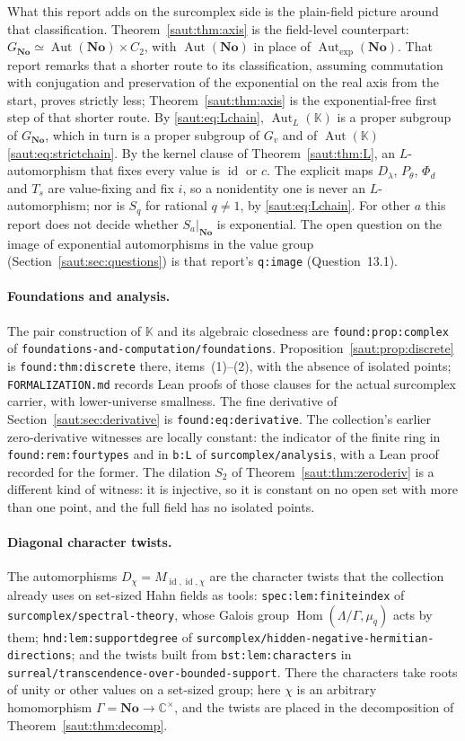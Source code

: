 \documentclass[11pt]{article}
\theoremstyle{definition}
\theoremstyle{remark}
\newcommand{\No}{\mathbf{No}}
\newcommand{\C}{\mathbb C}
\newcommand{\K}{\mathbb K}
\newcommand{\id}{\operatorname{id}}
\newcommand{\Aut}{\operatorname{Aut}}
\newcommand{\Hom}{\operatorname{Hom}}
\newcommand{\Gexp}{\operatorname{Aut}_{\exp}(\No)}
\newcommand{\AutL}{\operatorname{Aut}_{L}}
\newcommand{\repo}[1]{\nolinkurl{#1}}%
\newcommand{\lbl}[1]{\nolinkurl{#1}}%
\numberwithin{equation}{section}
\begin{document}
What this report adds on the surcomplex side is the plain-field picture
around that classification. Theorem~\ref{saut:thm:axis} is the field-level
counterpart: $G_{\No}\simeq\Aut(\No)\times C_2$, with $\Aut(\No)$ in place of
$\Gexp$. That report remarks that a shorter route to its classification,
assuming commutation with conjugation and preservation of the exponential on
the real axis from the start, proves strictly less;
Theorem~\ref{saut:thm:axis} is the exponential-free first step of that
shorter route. By \eqref{saut:eq:Lchain}, $\AutL(\K)$ is a proper subgroup of
$G_{\No}$, which in turn is a proper subgroup of $G_v$ and of $\Aut(\K)$
\eqref{saut:eq:strictchain}. By the kernel clause of
Theorem~\ref{saut:thm:L}, an $L$-automorphism that fixes every value is
$\id$ or $c$. The explicit maps $D_\lambda$, $P_\theta$, $\Phi_d$ and $T_s$
are value-fixing and fix $i$, so a nonidentity one is never an
$L$-automorphism; nor is $S_q$ for rational $q\ne1$, by
\eqref{saut:eq:Lchain}. For other $a$ this report does not decide whether
$S_a|_{\No}$ is exponential. The open
question on the image of exponential automorphisms in the value group
(Section~\ref{saut:sec:questions}) is that report's
\lbl{q:image} (Question~13.1).

\paragraph{Foundations and analysis.} The pair construction of $\K$ and its
algebraic closedness are \lbl{found:prop:complex} of
\repo{foundations-and-computation/foundations}.
Proposition~\ref{saut:prop:discrete} is \lbl{found:thm:discrete} there,
items~(1)--(2), with the absence of isolated points; \repo{FORMALIZATION.md}
records Lean proofs of those clauses for the actual surcomplex carrier, with
lower-universe smallness. The fine derivative of
Section~\ref{saut:sec:derivative} is \lbl{found:eq:derivative}.
The collection's earlier zero-derivative witnesses are locally constant:
the indicator of the finite ring in \lbl{found:rem:fourtypes} and in
\lbl{b:L} of \repo{surcomplex/analysis}, with a Lean proof recorded for the
former. The dilation $S_2$ of Theorem~\ref{saut:thm:zeroderiv} is a
different kind of witness: it is injective, so it is constant on no open
set with more than one point, and the full field has no isolated points.

\paragraph{Diagonal character twists.} The automorphisms
$D_\chi=M_{\id,\id,\chi}$ are the character twists that the collection
already uses on set-sized Hahn fields as tools:
\lbl{spec:lem:finiteindex} of \repo{surcomplex/spectral-theory}, whose
Galois group $\Hom(\Lambda/\Gamma,\mu_q)$ acts by them;
\lbl{hnd:lem:supportdegree} of
\repo{surcomplex/hidden-negative-hermitian-directions}; and the twists
built from \lbl{bst:lem:characters} in
\repo{surreal/transcendence-over-bounded-support}. There the characters
take roots of unity or other values on a set-sized group; here $\chi$ is
an arbitrary homomorphism $\Gamma=\No\to\C^\times$, and the twists are
placed in the decomposition of Theorem~\ref{saut:thm:decomp}.
\end{document}
